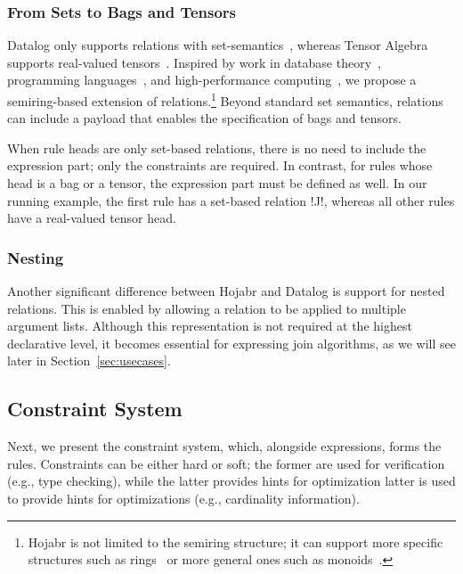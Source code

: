 \documentclass[sigconf,nonacm]{acmart}
\begin{document}
\subsubsection{From Sets to Bags and Tensors} 

Datalog only supports relations with set-semantics~\cite{abiteboul1995foundations}, whereas Tensor Algebra supports real-valued tensors~\cite{vasilache2018tensor}. Inspired by work in database theory~\cite{abo2016faq,green2007provenance,abo2024convergence,koch2010incremental}, programming languages~\cite{DBLP:journals/pacmpl/ShaikhhaHSO22,shaikhha2019finally,dolan2013fun}, and high-performance computing~\cite{kepner2011graph,graph_blas}, we propose a semiring-based extension of relations.\footnote{Hojabr is not limited to the semiring structure; it can support more specific structures such as rings~\cite{koch2010incremental} or more general ones such as monoids~\cite{fegaras2000optimizing}.} Beyond standard set semantics, relations can include a payload that enables the specification of bags and tensors.

 When rule heads are only set-based relations, there is no need to include the expression part; only the constraints are required. In contrast, for rules whose head is a bag or a tensor, the expression part must be defined as well. In our running example, the first rule has a set-based relation !J!, whereas all other rules have a real-valued tensor head.

\subsubsection{Nesting} Another significant difference between Hojabr and Datalog is support for nested relations. This is enabled by allowing a relation to be applied to multiple argument lists. Although this representation is not required at the highest declarative level, it becomes essential for expressing join algorithms, as we will see later in Section~\ref{sec:usecases}.

\subsection{Constraint System}
Next, we present the constraint system, which, alongside expressions, forms the rules. Constraints can be either hard or soft; the former are used for verification (e.g., type checking), while the latter provides hints for optimization latter is used to provide hints for optimizations (e.g., cardinality information).
\end{document}
